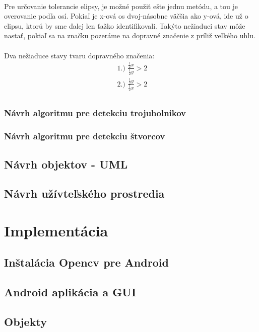\documentclass[12pt]{article}
\begin{document}
\paragraph{}
Pre určovanie tolerancie elipsy, je možné použiť ešte jednu metódu, a tou je overovanie podľa osí. 
Pokiaľ je x-ová os dvoj-násobne väčšia ako y-ová, ide už o elipsu, ktorú by sme ďalej len ťažko identifikovali. 
Takýto nežiaduci stav môže nastať, pokiaľ sa na značku pozeráme na dopravné značenie z príliž veľkého uhlu.
\paragraph{}
Dva nežiaduce stavy tvaru dopravného značenia:
\begin{align*}
		  \text{ 1.) }
          \frac{\frac{1}{2} x}{\frac{1}{2} y} > 2  \\
          \text{ 2.) }
          \frac{\frac{1}{2} y}{\frac{1}{2} x} > 2  \\
\end{align*}
\subsubsection{Návrh algoritmu pre detekciu trojuholnikov}
\subsubsection{Návrh algoritmu pre detekciu štvorcov}
\subsection{Návrh objektov - UML}
\subsection{Návrh užívteľského prostredia}

\section{Implementácia}
\subsection{Inštalácia Opencv pre Android}
\subsection{Android aplikácia a GUI}
\subsection{Objekty}
\end{document}
